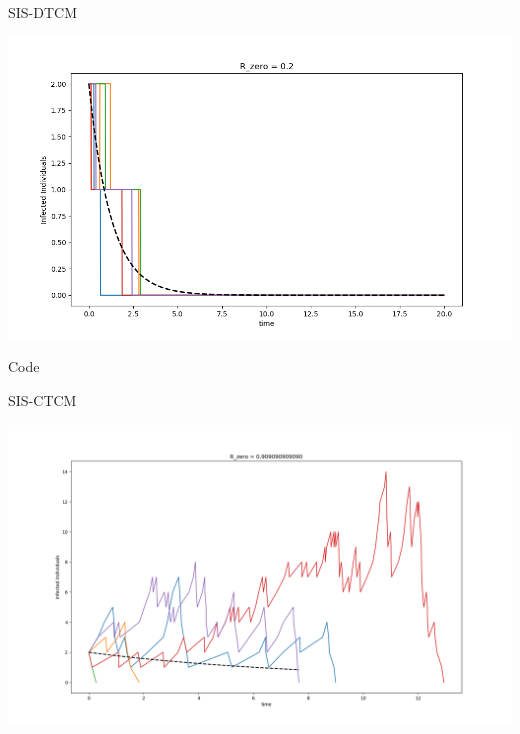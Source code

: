 \begin{frame}{SIS-DTCM}
    \begin{center}
    \includegraphics[width=\textwidth]{./homework/HW01.png}
    \end{center}
\end{frame}
\begin{frame}{Code}
    \begin{figure}
    \centering
      \tiny
    \lstset{language=python}
         
   \end{figure}
\end{frame}
\begin{frame}{SIS-CTCM}
    \begin{center}
    \includegraphics[width=\textwidth]{./homework/HW02.png}
    \end{center}
\end{frame}

